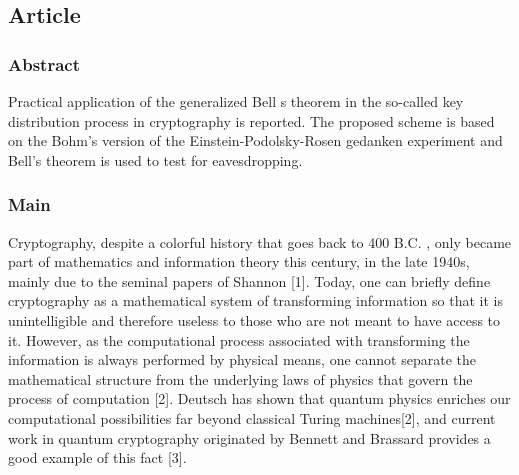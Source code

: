 
\subsection{Article}

\subsubsection*{Abstract}

Practical application of the generalized Bell s theorem in the so-called key distribution process in cryptography is reported. The proposed scheme is based on the Bohm's version of the Einstein-Podolsky-Rosen gedanken experiment and Bell's theorem is used to test for eavesdropping.

\subsubsection{Main}

Cryptography, despite a colorful history that goes back to 400 B.C. , only became part of mathematics and information theory this century, in the late 1940s, mainly due to the seminal papers of Shannon [1]. Today, one can briefly define cryptography as a mathematical system of transforming information so that it is unintelligible and therefore useless to those who are not meant to have access to it. However, as the computational process associated with transforming the information is always performed by physical means, one cannot separate the mathematical structure from the underlying laws of physics that govern the process of computation [2]. Deutsch has shown that quantum physics enriches our computational possibilities far beyond classical Turing machines[2], and current work in quantum cryptography originated by Bennett and Brassard provides a good example of this fact [3].

